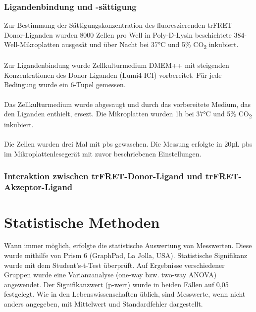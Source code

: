 \subsubsection{Ligandenbindung und -sättigung}
Zur Bestimmung der Sättigungskonzentration des fluoreszierenden trFRET-Donor-Liganden wurden 8000 Zellen pro Well in Poly-D-Lysin beschichtete 384-Well-Mikroplatten ausgesät und über Nacht bei 37\si{\celsius} und 5\% CO\textsubscript{2} inkubiert. 
\\ \\
Zur Ligandenbindung wurde Zellkulturmedium DMEM++ mit steigenden Konzentrationen des Donor-Liganden (Lumi4-ICI) vorbereitet. Für jede Bedingung wurde ein 6-Tupel gemessen.
\\ \\
Das Zellkulturmedium wurde abgesaugt und durch das vorbereitete Medium, das den Liganden enthielt, ersezt. Die Mikroplatten wurden 1\si{\hour} bei 37\si{\celsius} und 5\% CO\textsubscript{2} inkubiert.
\\ \\
Die Zellen wurden drei Mal mit \gls{pbs} gewaschen. Die Messung erfolgte in 20\si{\micro\liter} \gls{pbs} im Mikroplattenlesegerät mit zuvor beschriebenen Einstellungen.

\subsubsection{Interaktion zwischen trFRET-Donor-Ligand und trFRET-Akzeptor-Ligand}

\section{Statistische Methoden}
Wann immer möglich, erfolgte die statistische Auswertung von Messwerten. Diese wurde mithilfe von Prism 6 (GraphPad, La Jolla, USA). Statistische Signifikanz wurde mit dem Student's-t-Test überprüft. Auf Ergebnisse verschiedener Gruppen wurde eine Varianzanalyse (one-way bzw. two-way ANOVA) angewendet. Der Signifikanzwert (p-wert) wurde in beiden Fällen auf 0,05 festgelegt. Wie in den Lebenswissenschaften üblich, sind Messwerte, wenn nicht anders angegeben, mit Mittelwert und Standardfehler dargestellt. 

